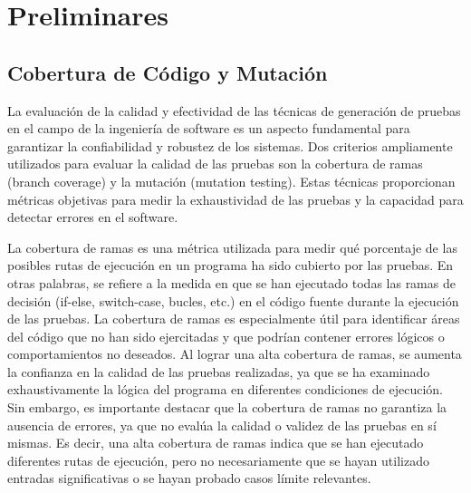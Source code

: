 \chapter[Preliminares]{Preliminares}
\label{cap:preliminares.BE}


\section{Cobertura de Código y Mutación}

La evaluación de la calidad y efectividad de las técnicas de generación de pruebas en el campo de la ingeniería de software es un aspecto fundamental para garantizar la confiabilidad y robustez de los sistemas. Dos criterios ampliamente utilizados para evaluar la calidad de las pruebas son la  cobertura de ramas (branch coverage)  y la mutación (mutation testing). Estas técnicas proporcionan métricas objetivas para medir la exhaustividad de las pruebas y la capacidad para detectar errores en el software.

La cobertura de ramas es una métrica utilizada para medir qué porcentaje de las posibles rutas de ejecución en un programa ha sido cubierto por las pruebas. En otras palabras, se refiere a la medida en que se han ejecutado todas las ramas de decisión (if-else, switch-case, bucles, etc.) en el código fuente durante la ejecución de las pruebas. La cobertura de ramas es especialmente útil para identificar áreas del código que no han sido ejercitadas y que podrían contener errores lógicos o comportamientos no deseados.
Al lograr una alta cobertura de ramas, se aumenta la confianza en la calidad de las pruebas realizadas, ya que se ha examinado exhaustivamente la lógica del programa en diferentes condiciones de ejecución. Sin embargo, es importante destacar que la cobertura de ramas no garantiza la ausencia de errores, ya que no evalúa la calidad o validez de las pruebas en sí mismas. Es decir, una alta cobertura de ramas indica que se han ejecutado diferentes rutas de ejecución, pero no necesariamente que se hayan utilizado entradas significativas o se hayan probado casos límite relevantes.

